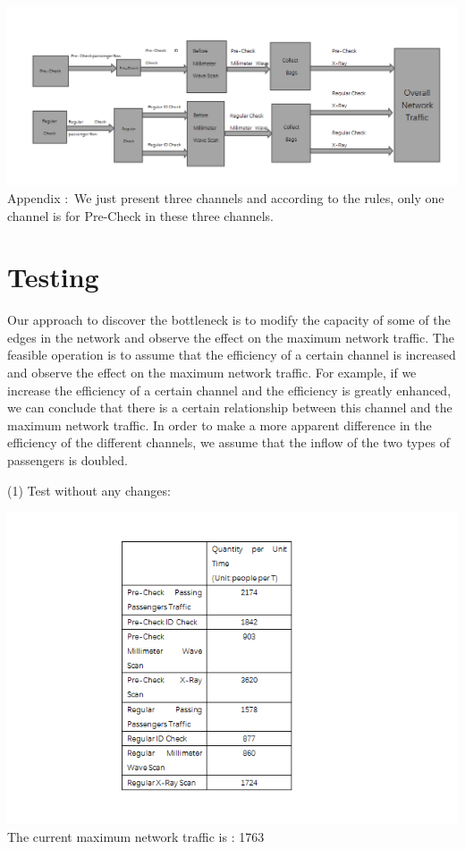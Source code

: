 \documentclass[12pt]{article}
\begin{document}
\includegraphics[width=15cm]{m1.png}
Appendix $:$ We just present three channels and according to the rules, only one channel is for Pre-Check in these three channels.

\section{Testing}

\setlength{\parindent}{2em}
Our approach to discover the bottleneck is to modify the capacity of some of the edges in the network and observe the effect on the maximum network traffic. The feasible operation is to assume that the efficiency of a certain channel is increased and observe the effect on the maximum network traffic. For example, if we increase the efficiency of a certain channel and the efficiency is greatly enhanced, we can conclude that there is a certain relationship between this channel and the maximum network traffic.
In order to make a more apparent difference in the efficiency of the different channels, we assume that the inflow of the two types of passengers is doubled.

(1) Test without any changes:

\includegraphics[width=15cm]{p2.png}
     The current maximum network traffic is : 1763
\end{document}
